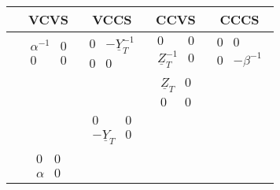 \renewcommand{\arraystretch}{1.1}
\begin{tabular}{|c|c|c|c|c|}
	\hline
	& VCVS& VCCS & CCVS & CCCS\\
	\hline
	[\underline{A}]& $\begin{matrix}
		\alpha^{-1} & 0 \\
		0 & 0
	\end{matrix}$ & $\begin{matrix}
		0 & -\underline{Y}_T^{-1} \\
		0 & 0
	\end{matrix}$ & $\begin{matrix}
	0 & 0 \\
\underline{Z}_T^{-1} & 0
	\end{matrix}$ & $\begin{matrix}
	0 & 0 \\
	0 & -\beta^{-1}
	\end{matrix}$\\
	\hline
	[\underline{Z}]& & & $\begin{matrix}
		\underline{Z}_T & 0 \\
		0 & 0
	\end{matrix}$ &\\
	\hline
	[\underline{Y}]& & $\begin{matrix}
		0 & 0 \\
		-\underline{Y}_T & 0
	\end{matrix}$ & & \\
	\hline
	[\underline{H]}& & & & $\begin{matrix}
		0 & 0 \\
		-\beta & 0
	\end{matrix}$\\
	\hline
	[\underline{C}]& $\begin{matrix}
		0 & 0 \\
		\alpha & 0
	\end{matrix}$ & & &\\
	\hline
\end{tabular}
